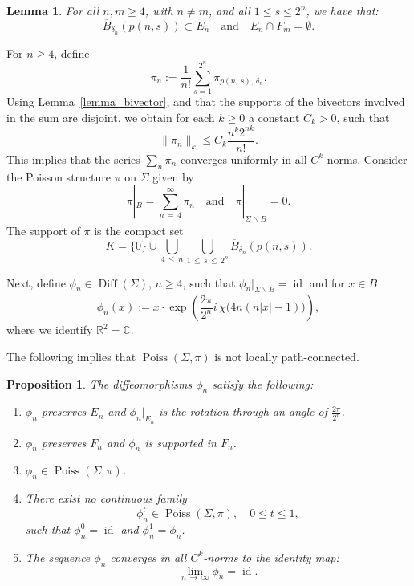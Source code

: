 \documentclass[10pt]{amsart}
\newtheorem{prop}[cdrthm]{Proposition}
\newtheorem{lemm}[cdrthm]{Lemma}
\theoremstyle{definition}
\newcommand{\R}{\mathbb{R}}
\newcommand{\norm}[1]{\|#1\|}
\newcommand{\bbC}{\mathbb{C}}
\DeclareMathOperator{\Poiss}{Poiss}
\DeclareMathOperator{\Diff}{Diff}
\DeclareMathOperator{\id}{id}
\newcommand*{\alphenumi}{\renewcommand*{\theenumi}{\alph{enumi}}}
\begin{document}
\begin{lemm}\label{lemma_annuli}
For all $n,m\geq 4$, with $n\neq m$, and all $1\leq s\leq 2^n$, we have that:
\[
\overline{B}_{\delta_n}\left(p(n,s)\right)\subset E_n\quad \text{and}\quad E_n\cap F_m=\emptyset.
\]
\end{lemm}

For $n\geq 4$, define
\[
\pi_n:=\frac{1}{n!}\sum_{s=1}^{2^n}\pi_{p(n,\,s),\,\delta_{n}}.
\]
Using Lemma~\eqref{lemma_bivector}, and that the supports of the bivectors involved in the sum are disjoint, we obtain for each $k\geq 0$ a constant $C_k>0$, such that
\[
\norm{\pi_n}_k\leq C_k\frac{n^k2^{nk}}{n!}.
\]
This implies that the series $\sum_n \pi_n$ converges uniformly in all $C^k$-norms. Consider the Poisson structure $\pi$ on $\Sigma$ given by
\[
\pi|_B=\sum_{n\,=\,4}^{\infty}\pi_n\quad \text{and}\quad \pi|_{\Sigma\,\backslash B}=0.
\]
The support of $\pi$ is the compact set
\[
K=\{0\}\cup \bigcup_{4\,\leq\,n}\bigcup_{1\,\leq\,s\,\leq\,2^n}\overline{B}_{\delta_{n}}\left(p(n,s)\right).
\]

Next, define $\phi_n\in\Diff(\Sigma)$, $n\geq 4$, such that $\phi_n|_{\Sigma\backslash B}=\id$ and for $x\in B$
\[
\phi_n(x):=x\cdot \exp\left(\frac{2\pi}{2^n}i\, \chi\big(4n(n|x|-1)\big)\right),
\]
where we identify $\R^2=\bbC$.

The following implies that $\Poiss(\Sigma,\pi)$ is not locally path-connected.


\begin{prop}\label{prop}
The diffeomorphisms $\phi_n$ satisfy the following:
\begin{enumerate}\alphenumi
\item \label{prop1.3.1}$\phi_n$ preserves $E_n$ and $\phi_n|_{E_n}$ is the rotation through an angle of $\tfrac{2\pi}{2^{n}}$.
\item \label{prop1.3.2}$\phi_n$ preserves $F_n$ and $\phi_n$ is supported in $F_n$.
\item \label{prop1.3.3}$\phi_n\in\Poiss(\Sigma,\pi)$.
\item \label{prop1.3.4}There exist no continuous family
\[
\phi_n^t\in \Poiss(\Sigma,\pi), \quad 0\leq t\leq 1,
\]
such that $\phi_n^0=\id$ and $\phi_n^1=\phi_n$.
\item\label{prop1.3.5} The sequence $\phi_n$ converges in all $C^k$-norms to the identity map:
\[
\lim_{n\,\to\,\infty}\phi_n=\id.
\]
\end{enumerate}
\end{prop}
\end{document}
